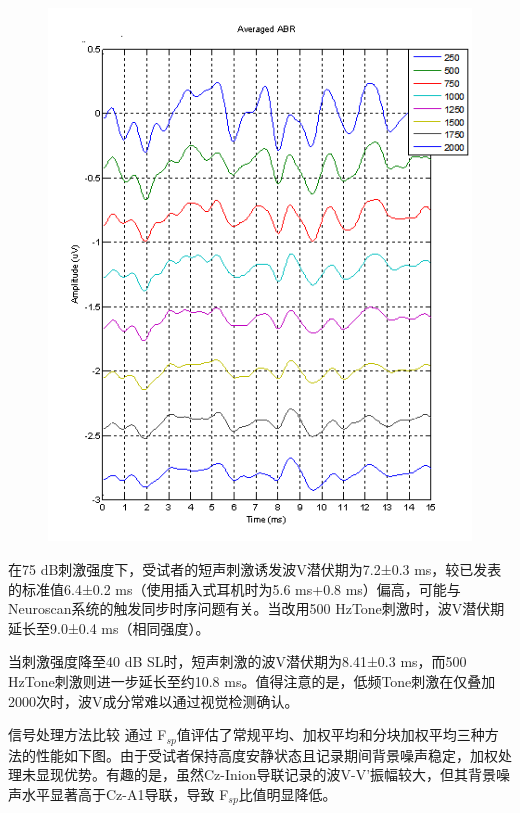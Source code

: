 \begin{figure}[H]
\begin{minipage}{0.48\textwidth}
        \includegraphics[width=\textwidth]{images/improvingSNRwaveformAveraging40.png}
    \end{minipage}
\end{figure}
在75 dB刺激强度下，受试者的短声刺激诱发波V潜伏期为7.2±0.3 ms，较已发表的标准值6.4±0.2 ms（使用插入式耳机时为5.6 ms+0.8 ms）偏高，可能与Neuroscan系统的触发同步时序问题有关。当改用500 HzTone刺激时，波V潜伏期延长至9.0±0.4 ms（相同强度）。

当刺激强度降至40 dB SL时，短声刺激的波V潜伏期为8.41±0.3 ms，而500 HzTone刺激则进一步延长至约10.8 ms。值得注意的是，低频Tone刺激在仅叠加2000次时，波V成分常难以通过视觉检测确认。

信号处理方法比较
通过 F$_{sp}$值评估了常规平均、加权平均和分块加权平均三种方法的性能如下图。由于受试者保持高度安静状态且记录期间背景噪声稳定，加权处理未显现优势。有趣的是，虽然Cz-Inion导联记录的波V-V'振幅较大，但其背景噪声水平显著高于Cz-A1导联，导致 F$_{sp}$比值明显降低。



